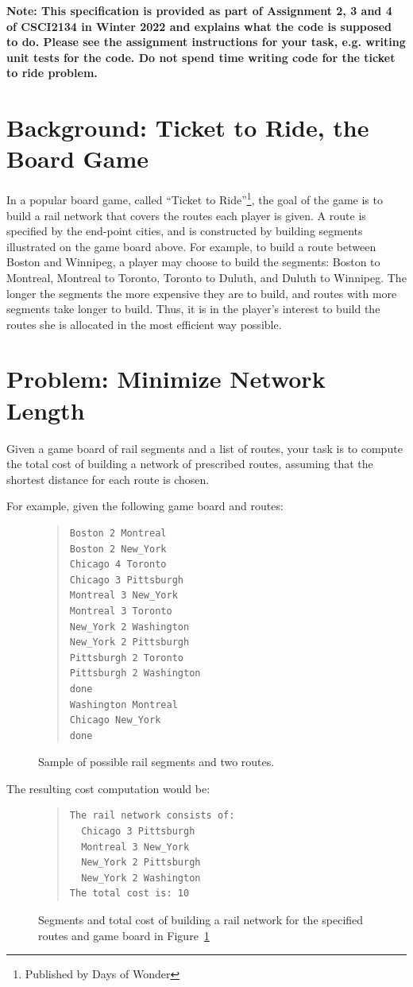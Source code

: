 \documentclass[12pt,pdftex]{article}
\begin{document}
\textbf{Note: This specification is provided as part of Assignment 2, 3 and 4 of CSCI2134 in Winter 2022 and explains what the code is supposed to do. Please see the assignment instructions for your task, e.g. writing unit tests for the code. Do not spend time writing code for the ticket to ride problem.}


\section*{Background: Ticket to Ride, the Board Game}
In a popular board game, called ``Ticket to Ride''\footnote{Published
by Days of Wonder}, the goal of the game is to build a rail network
that covers the routes each player is given.  A route is specified by
the end-point cities, and is constructed by building segments
illustrated on the game board above.  For example, to build a route
between Boston and Winnipeg, a player may choose to build the
segments: Boston to Montreal, Montreal to Toronto, Toronto to Duluth,
and Duluth to Winnipeg.  The longer the segments the more expensive they
are to build, and routes with more segments take longer to build.
Thus, it is in the player's interest to build the routes she is allocated
in the most efficient way possible.  

\section*{Problem: Minimize Network Length}
Given a game board of rail segments and a list of routes, your task
is to compute the total cost of building a network of prescribed
routes, assuming that the shortest distance for each route is chosen.

For example, given the following game board and routes:
\begin{figure}[h]
\begin{quote}
\begin{verbatim}
Boston 2 Montreal
Boston 2 New_York
Chicago 4 Toronto
Chicago 3 Pittsburgh
Montreal 3 New_York
Montreal 3 Toronto
New_York 2 Washington
New_York 2 Pittsburgh
Pittsburgh 2 Toronto
Pittsburgh 2 Washington
done
Washington Montreal
Chicago New_York
done
\end{verbatim}
\end{quote}
\caption{Sample of possible rail segments and two routes.  \label{fig:input}}
\end{figure}

The resulting cost computation would be:
\begin{figure}[h]
\begin{quote}
\begin{verbatim}
The rail network consists of:
  Chicago 3 Pittsburgh
  Montreal 3 New_York
  New_York 2 Pittsburgh
  New_York 2 Washington
The total cost is: 10
\end{verbatim}
\end{quote}
\caption{Segments and total cost of building a rail network for the specified
         routes and game board in Figure~\ref{fig:input} \label{fig:output}}
\end{figure}
\end{document}
